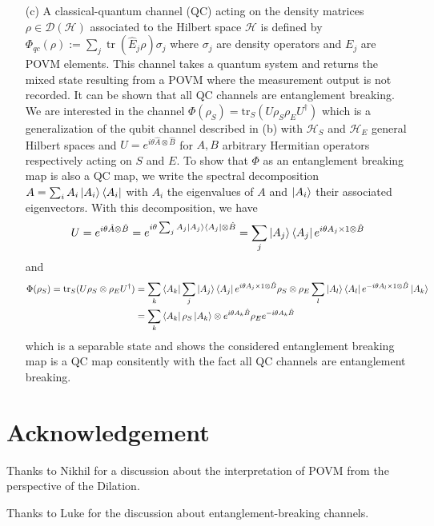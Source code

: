 \documentclass[10pt, a4paper]{article}
\begin{document}
{\begin{enumerate}
  \item[(c)] A classical-quantum channel (QC) acting on the density matrices $\rho \in \mathcal{D}(\mathcal{H})$ associated to the Hilbert space $\mathcal{H}$ is defined by $\Phi_{qc}(\rho) := \sum_j \operatorname{tr}\left(\hat{E}_j \rho\right) \sigma_j$ where $\sigma_j$ are density operators and $E_j$ are POVM elements. This channel takes a quantum system and returns the mixed state resulting from a POVM where the measurement output is not recorded. It can be shown that all QC channels are entanglement breaking. We are interested in the channel $\Phi(\rho_S) = \text{tr}_S(U \rho_S \rho_E U^\dagger)$ which is a generalization of the qubit channel described in (b) with $\mathcal{H}_S$ and $\mathcal{H}_E$ general Hilbert spaces and $U = e^{i \theta \hat{A} \otimes \hat{B}}$ for $A, B$ arbitrary Hermitian operators respectively acting on $S$ and $E$. To show that $\Phi$ as an entanglement breaking map is also a QC map, we write the spectral decomposition $A = \sum_i A_i \ket{A_i}\bra{A_i}$ with $A_i$ the eigenvalues of $A$ and $\ket{A_i}$ their associated eigenvectors. With this decomposition, we have 
  \begin{align*}
    U = e^{i \theta \hat{A} \otimes \hat{B}} =  e^{i \theta \sum_j A_j \ket{A_j}\bra{A_j} \otimes \hat{B}} = \sum_j \ket{A_j}\bra{A_j} e^{i \theta  A_j \times 1 \otimes \hat{B}}
  \end{align*}
  and 
  \begin{align*}
    \Phi(\rho_S) = \text{tr}_S (U \rho_S\otimes\rho_E U^\dagger) &= \sum_k \bra{A_k}    \sum_j \ket{A_j}\bra{A_j} e^{i \theta  A_j \times 1 \otimes \hat{B}} \rho_S\otimes\rho_E \sum_l \ket{A_l}\bra{A_l} e^{-i \theta  A_l \times 1 \otimes \hat{B}} \ket{A_k}  \\
    &= \sum_k  \bra{A_k}\rho_S\ket{A_k}\otimes  e^{i \theta  A_k \hat{B}}\rho_E e^{-i \theta  A_k \hat{B}} 
  \end{align*}
  which is a separable state and shows the considered entanglement breaking map is a QC map consitently with the fact all QC channels are entanglement breaking.
\end{enumerate}


\section{Acknowledgement}

Thanks to Nikhil for a discussion about the interpretation of POVM from the perspective of the Dilation. 

Thanks to Luke for the discussion about entanglement-breaking channels. 

}




\end{document}
